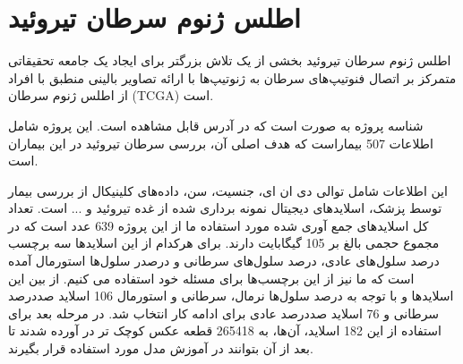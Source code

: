 \section{اطلس ژنوم سرطان تیروئید}\label{subsec:موسسه-ملی-سرطان-پورتال-داده-های-مشترک-ژنومیک}

اطلس ژنوم سرطان تیروئید بخشی از یک تلاش بزرگتر برای ایجاد یک جامعه تحقیقاتی متمرکز بر اتصال فنوتیپ‌های سرطان به ژنوتیپ‌ها با ارائه تصاویر بالینی منطبق با افراد از اطلس ژنوم سرطان (TCGA) است.\cite{clark2013cancer}

شناسه پروژه به صورت  است که در آدرس \cite{ncigdc} قابل مشاهده است. این پروژه شامل اطلاعات 507 بیماراست که هدف اصلی آن، بررسی سرطان تیروئید در این بیماران است.

این اطلاعات شامل توالی دی ان ای، جنسیت، سن، داده‌های کلینیکال از بررسی بیمار توسط پزشک، اسلایدهای دیجیتال نمونه برداری شده از غده تیروئید و ... است.
تعداد کل اسلاید‌های جمع آوری شده مورد استفاده ما از این پروژه 639 عدد است که در مجموع حجمی بالغ بر 105 گیگابایت دارند. برای هرکدام از این اسلاید‌ها سه برچسب درصد سلول‌های عادی، درصد سلول‌های سرطانی و درصدر سلول‌ها استورمال آمده است که ما نیز از این برچسب‌ها برای مسئله خود استفاده می کنیم. از بین این اسلاید‌ها و با توجه به درصد سلول‌ها نرمال، سرطانی و استورمال 106 اسلاید صددرصد سرطانی و 76 اسلاید صددرصد عادی برای ادامه کار انتخاب شد.
در مرحله بعد برای استفاده از این 182 اسلاید، آن‌ها، به 265418 قطعه عکس کوچک تر در آورده شدند تا بعد از آن بتوانند در آموزش مدل مورد استفاده قرار بگیرند.